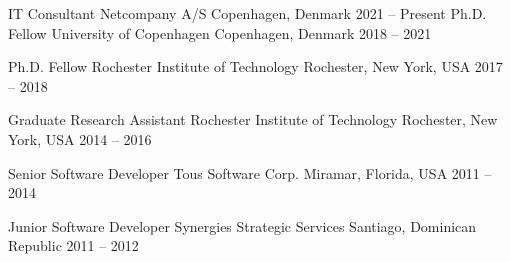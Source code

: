 

\begin{cventries}
  \cventry
    {IT Consultant}
    {Netcompany A/S}
    {Copenhagen, Denmark}
    {2021 -- Present}
    {}
  \cventry
    {Ph.D. Fellow}
    {University of Copenhagen}
    {Copenhagen, Denmark}
    {2018 -- 2021}
    {}

  \cventry
    {Ph.D. Fellow}
    {Rochester Institute of Technology}
    {Rochester, New York, USA}
    {2017 -- 2018}
    {}

  \cventry
    {Graduate Research Assistant}
    {Rochester Institute of Technology}
    {Rochester, New York, USA}
    {2014 -- 2016}
    {}

  \cventry
    {Senior Software Developer}
    {Tous Software Corp.}
    {Miramar, Florida, USA}
    {2011 -- 2014}
    {}

  \cventry
    {Junior Software Developer}
    {Synergies Strategic Services}
    {Santiago, Dominican Republic}
    {2011 -- 2012}
    {}
	
\end{cventries}

